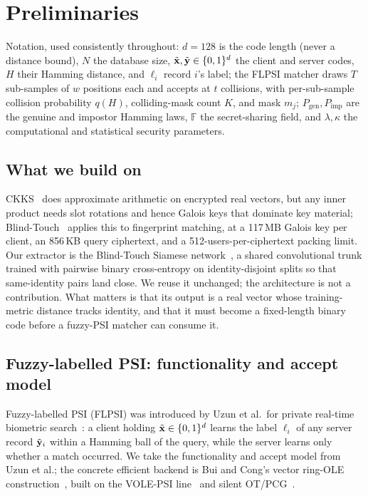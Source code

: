 \section{Preliminaries}
\label{sec:prelim}

Notation, used consistently throughout: $d=128$ is the code length (never a distance bound), $N$ the
database size, $\tilde{\mathbf{x}},\tilde{\mathbf{y}} \in \{0,1\}^d$ the client and server codes, $H$ their Hamming distance, and
$\ell_i$ record $i$'s label; the FLPSI matcher draws $T$ sub-samples of $w$ positions each and accepts
at $t$ collisions, with per-sub-sample collision probability $q(H)$, colliding-mask count $K$, and mask
$m_j$; $P_{\mathrm{gen}},P_{\mathrm{imp}}$ are the genuine and impostor Hamming laws, $\mathbb{F}$ the
secret-sharing field, and $\lambda,\kappa$ the computational and statistical security parameters.

\subsection{What we build on}

CKKS~\cite{CKKS17} does approximate arithmetic on encrypted real vectors, but any inner product needs
slot rotations and hence Galois keys that dominate key material; Blind-Touch~\cite{ChoiWooKim24}
applies this to fingerprint matching, at a 117\,MB Galois key per client, an 856\,KB query ciphertext,
and a 512-users-per-ciphertext packing limit. Our extractor is the Blind-Touch Siamese
network~\cite{ChoiWooKim24,KimOhKim20}, a shared convolutional trunk trained with pairwise
binary cross-entropy on identity-disjoint splits so that same-identity pairs land close. We reuse it
unchanged; the architecture is not a contribution. What matters is that its output is a real vector
whose training-metric distance tracks identity, and that it must become a fixed-length binary code
before a fuzzy-PSI matcher can consume it.

\subsection{Fuzzy-labelled PSI: functionality and accept model}
\label{sec:flpsi-prelim}

Fuzzy-labelled PSI (FLPSI) was introduced by Uzun et al.\ for private real-time biometric
search~\cite{UzunEtAl21}: a client holding $\tilde{\mathbf{x}} \in \{0,1\}^{d}$ learns the label $\ell_i$ of any
server record $\tilde{\mathbf{y}}_i$ within a Hamming ball of the query, while the server learns only whether a
match occurred. We take the functionality and accept model from Uzun et al.; the concrete efficient
backend is Bui and Cong's vector ring-OLE construction~\cite{BuiCong25}, built on the VOLE-PSI
line~\cite{RindalSchoppmann21} and silent OT/PCG~\cite{BoyleEtAl19}.

